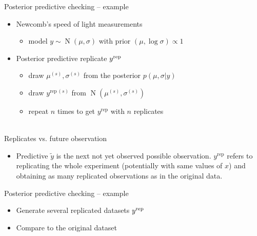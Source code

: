 \documentclass[t]{beamer}
\DeclareMathOperator{\N}{N}
\begin{document}
\begin{frame}[fragile]

  {\Large\color{navyblue} Posterior predictive checking -- example}

  \begin{itemize}
  \item<1-> Newcomb's speed of light measurements
    \begin{itemize}
    \item model $y\sim\N(\mu,\sigma)$ with prior $(\mu,\log\sigma)\propto 1$
    \end{itemize}
  \item<2-> Posterior predictive replicate $y^{\rm rep}$
    \begin{itemize}
    \item<3-> draw $\mu^{(s)},\sigma^{(s)}$ from the posterior $p(\mu,\sigma|y)$
    \item<4-> draw $y^{\mathrm{rep}\,(s)}$ from $\N(\mu^{(s)},\sigma^{(s)})$
    \item<5-> repeat $n$ times to get $y^{\mathrm{rep}}$ with $n$ replicates\\~\\
      \end{itemize}
    \end{itemize}

\end{frame}

\begin{frame}

  {\Large\color{navyblue} Replicates vs. future observation}

  \begin{itemize}
  \item Predictive $\tilde{y}$ is the next not yet observed possible
    observation. $y^{\mathrm{rep}}$ refers to replicating the whole
    experiment (potentially with same values of $x$) and obtaining as
    many replicated observations as in the original data.
  \end{itemize}

\end{frame}

\begin{frame}[fragile]

  {\Large\color{navyblue} Posterior predictive checking -- example}

  \begin{itemize}
  \item<1-> Generate several replicated datasets $y^{\rm rep}$
  \item<2-> Compare to the original dataset
  \end{itemize}
  \vspace{-1\baselineskip}

\end{frame}
\end{document}
